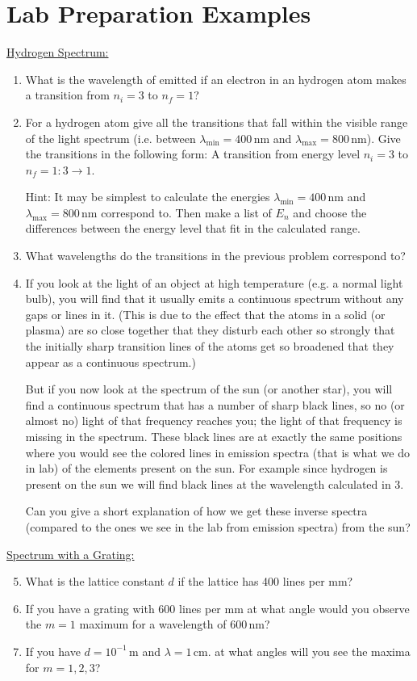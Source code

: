 \section{Lab Preparation Examples}
\underline{Hydrogen Spectrum:}
\begin{enumerate}
\item What is the wavelength of emitted if an electron in an hydrogen atom makes a transition from $n_i=3$ to $n_f=1$?

\item For a hydrogen atom give all the transitions that fall within the visible range of the light spectrum (i.e. between $\lambda_{\mathrm{min}}=400\,\mathrm{nm}$ and $\lambda_{\mathrm{max}}=800\,\mathrm{nm}$). Give the transitions in the following form:
A transition from energy level $n_i=3$ to $n_f=1:3 \rightarrow 1$.\myskip

Hint: It may be simplest to calculate the energies $\lambda_{\mathrm{min}}=400\,\mathrm{nm}$ and $\lambda_{\mathrm{max}}=800\,\mathrm{nm}$ correspond to. Then make a list of $E_{n}$ and choose the differences between the energy
level that fit in the calculated range.

\item What wavelengths do the transitions in the previous problem correspond to?
\item If you look at the light of an object at high temperature (e.g. a normal light bulb), you will find that it usually emits a continuous spectrum without any gaps or lines in it. (This is due to the effect that the atoms in a solid (or plasma) are so close together that they disturb each other so strongly that the initially sharp transition lines of the atoms get so broadened that they appear as a continuous spectrum.)\myskip

But if you now look at the spectrum of the sun (or another star), you will find a continuous spectrum that has a number of sharp black lines, so no (or almost no) light of that frequency reaches you; the light of that frequency is missing in the spectrum. These black lines are at exactly the same positions where you would see the colored lines in emission spectra (that is what we do in lab) of the elements present on the sun. For example since hydrogen is present on the sun we will find black lines at the
wavelength calculated in 3.\myskip

Can you give a short explanation of how we get these inverse spectra (compared to the ones we see in the lab from emission spectra) from the sun?
\end{enumerate}

\noindent\underline{Spectrum with a Grating:}
\begin{enumerate}\setcounter{enumi}{4}
\item What is the lattice constant $d$ if the lattice has 400 lines per mm?
\item If you have a grating with 600 lines per mm at what angle would you observe the $m=1$ maximum for a wavelength of $600\,\mathrm{nm}$?
\item If you have $d = 10^{-1}\, \mathrm{m}$ and $\lambda = 1\,\mathrm{cm}$. at what angles will you see the maxima for $m=1, 2, 3$?
\end{enumerate}
